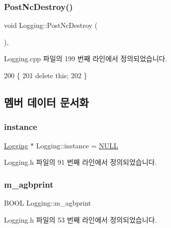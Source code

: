 \subsubsection{\texorpdfstring{Post\+Nc\+Destroy()}{PostNcDestroy()}}
{\footnotesize\ttfamily void Logging\+::\+Post\+Nc\+Destroy (\begin{DoxyParamCaption}{ }\end{DoxyParamCaption})\hspace{0.3cm}{\ttfamily [protected]}, {\ttfamily [virtual]}}



Logging.\+cpp 파일의 199 번째 라인에서 정의되었습니다.


\begin{DoxyCode}
200 \{
201   \textcolor{keyword}{delete} \textcolor{keyword}{this};
202 \}
\end{DoxyCode}


\subsection{멤버 데이터 문서화}
\mbox{\label{class_logging_abbc7b283056098e51d9791175abbdc23}} 
\subsubsection{\texorpdfstring{instance}{instance}}
{\footnotesize\ttfamily \mbox{\hyperlink{class_logging}{Logging}} $\ast$ Logging\+::instance = \mbox{\hyperlink{_system_8h_a070d2ce7b6bb7e5c05602aa8c308d0c4}{N\+U\+LL}}\hspace{0.3cm}{\ttfamily [static]}}



Logging.\+h 파일의 91 번째 라인에서 정의되었습니다.

\mbox{\label{class_logging_a1d79a280aa882918585c08f3e0c2b747}} 
\subsubsection{\texorpdfstring{m\+\_\+agbprint}{m\_agbprint}}
{\footnotesize\ttfamily B\+O\+OL Logging\+::m\+\_\+agbprint}



Logging.\+h 파일의 53 번째 라인에서 정의되었습니다.

